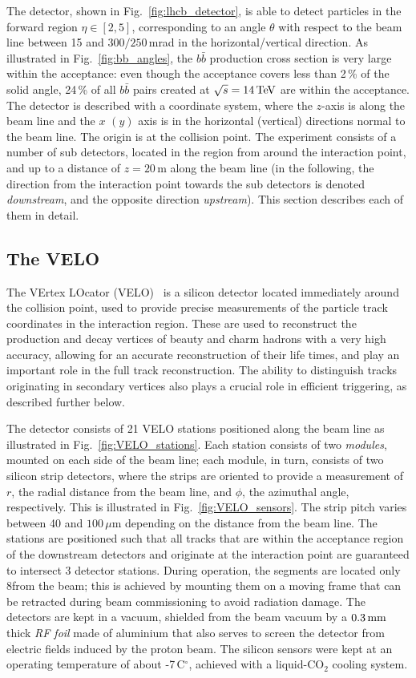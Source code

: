 The \lhcb detector, shown in Fig.~\ref{fig:lhcb_detector},  is able to detect particles in the forward region $\eta\in[2, 5]$, corresponding to an angle $\theta$ with respect to the beam line between 15 and $300/250$\,mrad in the horizontal/vertical direction. As illustrated in Fig.~\ref{fig:bb_angles}, the $b\bar b$ production cross section is very large within the \lhcb acceptance: even though the acceptance covers less than 2\,\% of the solid angle,  24\,\% of all $b\bar b$ pairs created at $\sqrt{s}=14\text{\,Te\kern -0.1em V}$ are within the acceptance. The detector is described with a coordinate system, where the $z$-axis is along the beam line and the $x$ $(y)$ axis is in the horizontal (vertical) directions normal to the beam line. The origin is at the collision point. The experiment consists of a number of sub detectors, located in the region from around the interaction point, and up to a distance of $z=20\,$m along the beam line (in the following, the direction from the interaction point towards the sub detectors is denoted \emph{downstream}, and the opposite direction \emph{upstream}). This section describes each of them in detail.
 
\subsection{The VELO} %
\label{sub:the_velo}
The VErtex LOcator (VELO)~\cite{VELO-TDR} is a silicon detector located immediately around the collision point, used to provide precise measurements of the particle track coordinates in the interaction region. These are used to reconstruct the production and decay vertices of beauty and charm hadrons with a very high accuracy, allowing for an accurate reconstruction of their life times, and play an important role in the full track reconstruction. The ability to distinguish tracks originating in secondary vertices also plays a crucial role in efficient triggering, as described further below.

The detector consists of 21 VELO stations positioned along the beam line as illustrated in Fig.~\ref{fig:VELO_stations}. Each station consists of two \emph{modules}, mounted on each side of the beam line; each module, in turn, consists of two silicon strip detectors,  where the strips are oriented to provide a measurement of $r$, the radial distance from the beam line, and  $\phi$, the azimuthal angle, respectively. This is illustrated in Fig.~\ref{fig:VELO_sensors}. The strip pitch varies between 40 and $100\,\mu$m depending on the distance from the beam line.  The stations are positioned such that all tracks that are within the acceptance region of the downstream detectors and originate at the interaction point are guaranteed to intersect 3 detector stations. During operation, the segments are located only 8\mm from the beam; this is achieved by mounting them on a moving frame that can be retracted during beam commissioning to avoid radiation damage. The detectors are kept in a vacuum, shielded from the beam vacuum by a $0.3\text{\,mm}$ thick \emph{RF foil} made of aluminium that also serves to screen the detector from electric fields induced by the proton beam. The silicon sensors were kept at an operating temperature of about -7\,C$^\circ$, achieved with a liquid-CO$_2$ cooling system.

